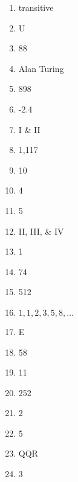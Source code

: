 \documentclass[../uilmath.tex]{subfiles}
\begin{document}
\begin{enumerate}[label=\bfseries\arabic*.]
    \item %
    transitive 

    \item %
    U 

    \item %
    88

    \item %
    Alan Turing 

    \item %
    898

    \item %
    -2.4

    \item %
    I \& II 

    \item %
    1,117

    \item %
    10

    \item %
    4 

    \item %
    5

    \item %
    II, III, \& IV 

    \item %
    1

    \item %
    74

    \item %
    512

    \item %
    ${1,1,2,3,5,8,\dots}$

    \item %
    E 

    \item %
    58

    \item %
    11
    
    \item %
    252

    \item %
    2

    \item %
    5

    \item %
    QQR 

    \item %
    3


\end{enumerate}
\end{document}
